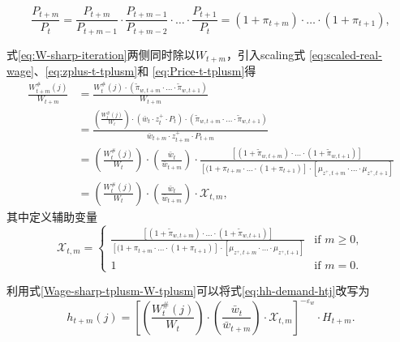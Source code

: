 \begin{equation}
  \label{eq:Price-t-tplusm}
  \frac{P_{t+m}}{P_t} = \frac{P_{t+m}}{P_{t+m-1}} \cdot \frac{P_{t+m-1}}{P_{t+m-2}} \cdot \ldots \cdot \frac{P_{t+1}}{P_{t}} = (1+\pi_{t+m}) \cdot \ldots \cdot (1+\pi_{t+1}),
\end{equation}

式\eqref{eq:W-sharp-iteration}两侧同时除以$W_{t+m}$，引入scaling式  \eqref{eq:scaled-real-wage}、\eqref{eq:zplus-t-tplusm}和  \eqref{eq:Price-t-tplusm}得
\begin{align}
\label{Wage-sharp-tplusm-W-tplusm}
  \frac{W_{t+m}^{\#}(j)}{W_{t+m}} &= \frac
{
  W_t^{\#}(j) \cdot \left(\tilde{\pi}_{w,t+m} \cdot \ldots \cdot \tilde{\pi}_{w,t+1}\right)
}{
W_{t+m}
} \\
&=\frac
{
  \left(\frac{W_t^{\#}(j)}{W_t}\right) \cdot \left(\bar{w}_{t} \cdot z_{t}^+ \cdot P_{t}\right)  \cdot \left(\tilde{\pi}_{w,t+m} \cdot \ldots \cdot \tilde{\pi}_{w,t+1}\right)
}{
\bar{w}_{t+m} \cdot z_{t+m}^+ \cdot P_{t+m}
} \\
&= \left(\frac{W_t^{\#}(j)}{W_t}\right) \cdot \left(\frac{\bar{w}_t}{\bar{w}_{t+m}}\right) \cdot \frac{
  \left[(1+\tilde{\pi}_{w,t+m}) \cdot \ldots \cdot (1+\tilde{\pi}_{w,t+1})\right]
  }{
  \left[(1+\pi_{t+m} \cdot \ldots \cdot (1+\pi_{t+1})\right] \cdot \left[\mu_{z^+,t+m} \cdot \ldots \cdot \mu_{z^+,t+1}\right]
  } \\
&=\left(\frac{W_t^{\#}(j)}{W_t}\right) \cdot \left(\frac{\bar{w}_t}{\bar{w}_{t+m}}\right) \cdot \mathcal{X}_{t,m},
\end{align}
其中定义辅助变量
\begin{equation}
  \label{eq:mathcal-X-auxiliary-definition}
  \mathcal{X}_{t,m}=
\begin{cases}
\frac{
  \left[(1+\tilde{\pi}_{w,t+m}) \cdot \ldots \cdot (1+\tilde{\pi}_{w,t+1})\right]
  }{
  \left[(1+\pi_{t+m} \cdot \ldots \cdot (1+\pi_{t+1})\right] \cdot \left[\mu_{z^+,t+m} \cdot \ldots \cdot \mu_{z^+,t+1}\right]
  } &\mbox{if } m \ge 0, \\
1 &\mbox{if } m=0.
\end{cases}
\end{equation}

利用式\eqref{Wage-sharp-tplusm-W-tplusm}可以将式\eqref{eq:hh-demand-htj}改写为
\begin{equation}
  \label{eq:h-H-t-m-j-interm}
  h_{t+m}(j) =\left[\left(\frac{W_t^{\#}(j)}{W_t}\right) \cdot \left(\frac{\bar{w}_t}{\bar{w}_{t+m}}\right) \cdot \mathcal{X}_{t,m} \right]^{-\varepsilon_w} \cdot H_{t+m}.
\end{equation}

